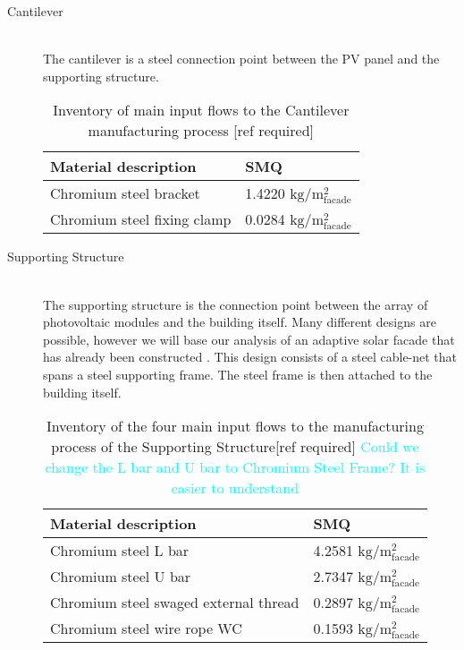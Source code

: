 \begin{description}
\item[Cantilever] \hfill \\
The cantilever is a steel connection point between the PV panel and the supporting structure.\\

\begin{table}[H]
\centering
\begin{tabular}{ll}
\hline
Material description & SMQ \\ \hline
Chromium steel bracket	 & 1.4220 ${\mathrm{kg/m^2_{facade}}}$ \\
Chromium steel fixing clamp  & 0.0284 ${\mathrm{kg/m^2_{facade}}}$\\
\hline
\end{tabular}
\caption{Inventory of main input flows to the Cantilever manufacturing process [ref required]}
\label{tab:CantileverInv}
\end{table}

\item[Supporting Structure] \hfill \\
The supporting structure is the connection point between the array of photovoltaic modules and the building itself. Many different designs are possible, however we will base our analysis of an adaptive solar facade that has already been constructed \cite{nagy2015frontiers}. This design consists of a steel cable-net that spans a steel supporting frame. The steel frame is then attached to the building itself.\\

\begin{table}[H]
\centering
\begin{tabular}{ll}
\hline
Material description & SMQ \\ \hline
Chromium steel L bar	 & 4.2581 ${\mathrm{kg/m^2_{facade}}}$ \\
Chromium steel U bar  & 2.7347 ${\mathrm{kg/m^2_{facade}}}$\\
Chromium steel swaged external thread  &0.2897 ${\mathrm{kg/m^2_{facade}}}$\\
Chromium steel wire rope WC  & 0.1593 ${\mathrm{kg/m^2_{facade}}}$\\
\hline
\end{tabular}
\caption{Inventory of the four main input flows to the manufacturing process of the Supporting Structure[ref required] \textcolor{cyan}{Could we change the L bar and U bar to Chromium Steel Frame? It is easier to understand}}
\label{tab:StructureInv}
\end{table}


\end{description}
